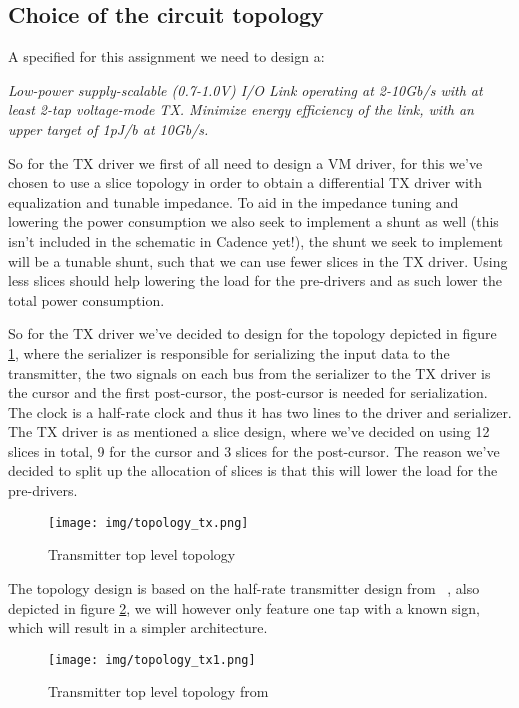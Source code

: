 \subsection{Choice of the circuit topology}

A specified for this assignment we need to design a:

\textit{Low-power supply-scalable (0.7-1.0V) I/O Link operating at 2-10Gb/s with at
least 2-tap voltage-mode TX. Minimize energy efficiency of the link, with an upper target
of 1pJ/b at 10Gb/s. }

So for the TX driver we first of all need to design a VM driver, for this we've chosen to use a slice topology in order to obtain a differential TX driver with equalization and tunable impedance. To aid in the impedance tuning and lowering the power consumption we also seek to implement a shunt as well (this isn't included in the schematic in Cadence yet!), the shunt we seek to implement will be a tunable shunt, such that we can use fewer slices in the TX driver. Using less slices should help lowering the load for the pre-drivers and as such lower the total power consumption.

So for the TX driver we've decided to design for the topology depicted in figure \ref{fig:topology}, where the serializer is responsible for serializing the input data to the transmitter, the two signals on each bus from the serializer to the TX driver is the cursor and the first post-cursor, the post-cursor is needed for serialization. The clock is a half-rate clock and thus it has two lines to the driver and serializer. The TX driver is as mentioned a slice design, where we've decided on using 12 slices in total, 9 for the cursor and 3 slices for the post-cursor. The reason we've decided to split up the allocation of slices is that this will lower the load for the pre-drivers.

\begin{figure}[H]
  \centering
  {\texttt{[image: img/topology\_tx.png]}}
  \caption{Transmitter top level topology}
  \label{fig:topology}
\end{figure}

The topology design is based on the half-rate transmitter design from ~\cite{menolfi2007a}, also depicted in figure \ref{fig:topology1}, we will however only feature one tap with a known sign, which will result in a simpler architecture.

\begin{figure}[H]
  \centering
  {\texttt{[image: img/topology\_tx1.png]}}
  \caption{Transmitter top level topology from ~\cite{menolfi2007a}}
  \label{fig:topology1}
\end{figure}


